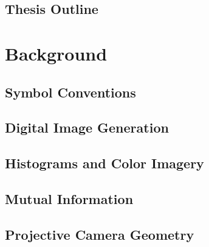 \documentclass[11pt]{report}
\begin{document}
\begin{doublespace}
\section{Thesis Outline}

\indent




\chapter{Background}

\indent


\section{Symbol Conventions}

\indent


\section{Digital Image Generation}

\indent



\section{Histograms and Color Imagery}

\indent



\section{Mutual Information}

\indent



\section{Projective Camera Geometry}


\end{doublespace}
\end{document}
